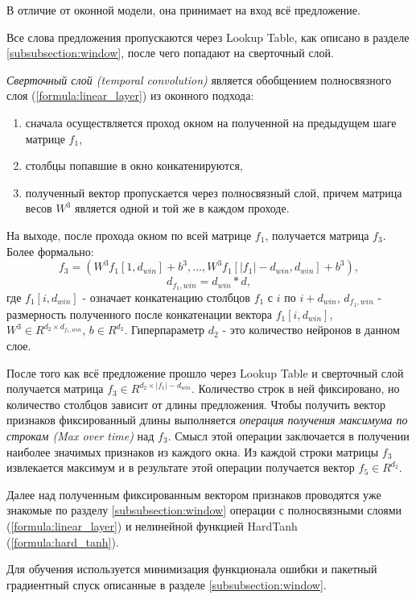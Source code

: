   В отличие от оконной модели, она принимает на вход всё предложение.

  Все слова предложения пропускаются через Lookup Table, как описано в разделе
  \ref{subsubsection:window}, после чего попадают на сверточный слой.

  \textit{Сверточный слой (temporal convolution)} является обобщением
  полносвязного слоя (\ref{formula:linear_layer}) из оконного подхода:
  \begin{enumerate}
    \item сначала осуществляется проход окном на полученной на предыдущем шаге матрице $f_1$,
    \item столбцы попавшие в окно конкатенируются,
    \item полученный вектор пропускается через полносвязный слой,
    причем матрица весов $W^3$ является одной и той же в каждом проходе.
  \end{enumerate}
  На выходе, после прохода окном по всей матрице $f_1$, получается матрица $f_3$.
  Более формально:
  \[
  f_3 =(W^3 f_1[1, d_{win}] + b^3,\ldots,W^3 f_1[|f_1| - d_{win}, d_{win}] + b^3),
  \]
  \[
  d_{f_1, win} = d_{win}*d,
  \]
  где $f_1[i, d_{win}]$ - означает конкатенацию столбцов $f_1$ с $i$ по $i + d_{win}$,
  $d_{f_1, win}$ - размерность полученного после конкатенации вектора $f_1[i, d_{win}]$,
  $W^3 \in R^{d_{2} \times d_{f_1, win}}$, $b \in R^{d_2}$. Гиперпараметр $d_{2}$ -
  это количество нейронов в данном слое.

  После того как всё предложение прошло через Lookup Table и сверточный слой
  получается матрица $f_3 \in R^{d_2\times |f_1| - d_{win}}$.
  Количество строк в ней фиксировано, но количество столбцов зависит от длины предложения.
  Чтобы получить вектор признаков фиксированный длины выполняется \textit{операция
  получения максимума по строкам (Max over time)} над $f_3$.
  Смысл этой операции заключается в получении наиболее значимых признаков из каждого окна.
  Из каждой строки матрицы $f_3$ извлекается максимум и в результате этой
  операции получается вектор $f_5 \in R^{d_2}$.

  Далее над полученным фиксированным вектором признаков проводятся уже
  знакомые по разделу \ref{subsubsection:window}
  операции с полносвязными слоями (\ref{formula:linear_layer}) и
  нелинейной функцией HardTanh (\ref{formula:hard_tanh}).

  Для обучения используется минимизация функционала ошибки и пакетный градиентный
  спуск описанные в разделе \ref{subsubsection:window}.

